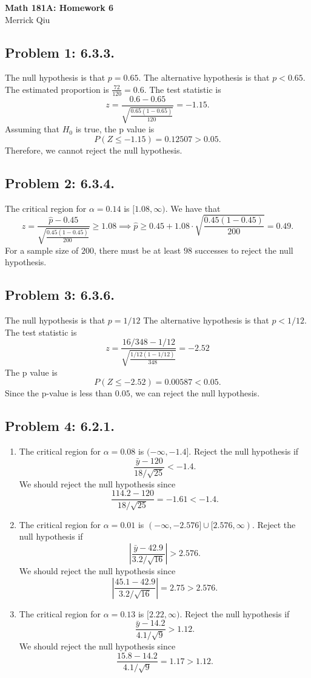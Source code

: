 \documentclass{article}
\begin{document}
\begin{center}
	\huge{\bf Math 181A: Homework 6} \\
	Merrick Qiu 
\end{center}

\subsection*{Problem 1: 6.3.3.}
The null hypothesis is that $p = 0.65$.
The alternative hypothesis is that $p < 0.65$.
The estimated proportion is $\frac{72}{120} = 0.6$.
The test statistic is 
\[
	z = \frac{0.6-0.65}{\sqrt{\frac{0.65(1-0.65)}{120}}} = -1.15.
\]
Assuming that $H_0$ is true, the p value is 
\[
	P(Z \leq -1.15) = 0.12507 > 0.05.
\]
Therefore, we cannot reject the null hypothesis.
\newpage

\subsection*{Problem 2: 6.3.4.}
The critical region for $\alpha=0.14$ is $[1.08,\infty)$.
We have that 
\[
	z = \frac{\hat{p}-0.45}{\sqrt{\frac{0.45(1-0.45)}{200}}} \geq 1.08
	\implies \hat{p} \geq 0.45 + 1.08\cdot \sqrt{\frac{0.45(1-0.45)}{200}} = 0.49.
\]
For a sample size of $200$, there must be at least $98$ successes to reject
the null hypothesis.
\newpage 

\subsection*{Problem 3: 6.3.6.}
The null hypothesis is that $p=1/12$
The alternative hypothesis is that $p<1/12$.
The test statistic is 
\[
	z = \frac{16/348-1/12}{\sqrt{\frac{1/12(1-1/12)}{348}}} = -2.52
\]
The p value is 
\[
	P(Z \leq -2.52) = 0.00587 < 0.05.
\]
Since the p-value is less than $0.05$, we can reject the null hypothesis.
\newpage 

\subsection*{Problem 4: 6.2.1.}
\begin{enumerate}
	\item  The critical region for $\alpha=0.08$ is $(-\infty, -1.4]$.
	Reject the null hypothesis if 
	\[	
		\frac{\bar{y}-120}{18/\sqrt{25}} < -1.4.
	\]
	We should reject the null hypothesis since
	\[	
		\frac{114.2-120}{18/\sqrt{25}} = -1.61 < -1.4.
	\]
	\item The critical region for $\alpha=0.01$ 
	is $(-\infty, -2.576] \cup [2.576,\infty)$.
	Reject the null hypothesis if
	\[	
		\left|\frac{\bar{y}-42.9}{3.2/\sqrt{16}}\right| > 2.576.
	\]
	We should reject the null hypothesis since
	\[	
		\left|\frac{45.1-42.9}{3.2/\sqrt{16}}\right| = 2.75 > 2.576.
	\]
	\item The critical region for $\alpha=0.13$ is $[2.22,\infty)$.
	Reject the null hypothesis if
	\[	
		\frac{\bar{y}-14.2}{4.1/\sqrt{9}} > 1.12.
	\]
	We should reject the null hypothesis since
	\[	
		\frac{15.8-14.2}{4.1/\sqrt{9}} = 1.17 > 1.12.
	\]
\end{enumerate}
\newpage 
\end{document}
